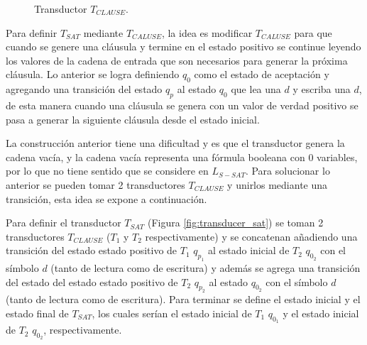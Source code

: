 \begin{figure}[h]
    \centering  \begin{otherlanguage}{english}
    \end{otherlanguage}
    \caption{Transductor $T_{CLAUSE}$.}
    \label{fig:transducer_clause} %
\end{figure}

Para definir $T_{SAT}$ mediante $T_{CALUSE}$, la idea es modificar $T_{CALUSE}$ para que cuando se genere
una cláusula y termine en el estado positivo se continue leyendo los valores de la cadena de entrada que
son necesarios para generar la próxima cláusula. Lo anterior se logra definiendo $q_0$ como el estado de
aceptación y agregando una transición del estado $q_p$ al estado $q_0$ que lea una $d$ y escriba una $d$,
de esta manera cuando una cláusula se genera con un valor de verdad positivo se pasa a generar la siguiente
cláusula desde el estado inicial.

La construcción anterior tiene una dificultad y es que el transductor genera la cadena vacía, y la cadena
vacía representa una fórmula booleana con 0 variables, por lo que no tiene sentido que se considere en $L_{S-SAT}$. Para
solucionar lo anterior se pueden tomar 2 transductores $T_{CLAUSE}$ y unirlos mediante una transición,
esta idea se expone a continuación.

Para definir el transductor $T_{SAT}$ (Figura \ref{fig:transducer_sat}) se toman 2 transductores
$T_{CLAUSE}$ ($T_1$ y $T_2$ respectivamente) y se concatenan añadiendo una transición del estado
estado positivo de $T_1$ $q_{p_1}$ al estado inicial de $T_2$ $q_{0_2}$ con el símbolo $d$
(tanto de lectura como de escritura) y además se agrega una transición del estado del estado
estado positivo de $T_2$ $q_{p_2}$ al estado $q_{0_2}$ con el símbolo $d$ (tanto de lectura como de escritura).
Para terminar se define el estado inicial y el estado final de $T_{SAT}$, los cuales serían el estado inicial de $T_1$
$q_{0_1}$ y el estado inicial de $T_2$ $q_{0_2}$, respectivamente.



